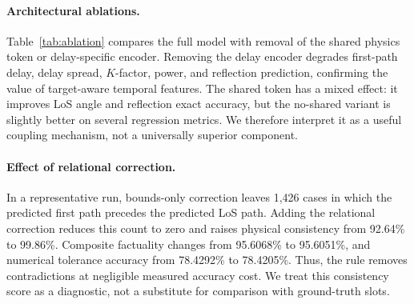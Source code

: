 \documentclass{article}
\begin{document}
\paragraph{Architectural ablations.}
Table~\ref{tab:ablation} compares the full model with removal of the shared physics token or delay-specific encoder.
Removing the delay encoder degrades first-path delay, delay spread, $K$-factor, power, and reflection prediction, confirming the value of target-aware temporal features.
The shared token has a mixed effect: it improves LoS angle and reflection exact accuracy, but the no-shared variant is slightly better on several regression metrics.
We therefore interpret it as a useful coupling mechanism, not a universally superior component.

\begin{table}[t]
\centering
\caption{Selected three-seed ablations. Lower is better except reflection exact accuracy.}
\label{tab:ablation}
\end{table}

\paragraph{Effect of relational correction.}
In a representative run, bounds-only correction leaves 1,426 cases in which the predicted first path precedes the predicted LoS path.
Adding the relational correction reduces this count to zero and raises physical consistency from 92.64\% to 99.86\%.
Composite factuality changes from 95.6068\% to 95.6051\%, and numerical tolerance accuracy from 78.4292\% to 78.4205\%.
Thus, the rule removes contradictions at negligible measured accuracy cost.
We treat this consistency score as a diagnostic, not a substitute for comparison with ground-truth slots.
\end{document}
